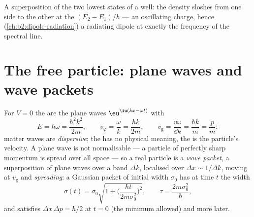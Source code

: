 \begin{omfigure}

{\small A superposition of the two lowest states of a well: the
density sloshes from one side to the other at the 
$(E_2 - E_1)/h$ --- an oscillating charge, hence (\cref{ch:b2:dipole-radiation})
a radiating dipole at exactly the frequency of the spectral line.}
\end{omfigure}

\section{The free particle: plane waves and wave packets}

\begin{proposition}\label{prop:b2:schrodinger-wave-functions:free}
For $V = 0$ the  are the plane waves $\eu^{\iu(kx -
\omega t)}$ with
\[
E = \hbar\omega = \frac{\hbar^2k^2}{2m}, \qquad
v_\varphi = \frac{\omega}{k} = \frac{\hbar k}{2m}, \qquad
v_{\text{g}} = \frac{\dd\omega}{\dd k} = \frac{\hbar k}{m} = \frac{p}{m} :
\]
matter waves are \emph{dispersive}; the  has no physical
meaning, the \emph{} is the particle's velocity. A plane
wave is not normalisable --- a particle of perfectly sharp momentum is
spread over all space --- so a real particle is a \emph{wave
packet}, a superposition of plane waves over a band
$\Delta k$, localised over $\Delta x \sim 1/\Delta k$, moving at $v_{\text{g}}$ and
\emph{spreading}: a Gaussian packet of initial width $\sigma_0$ has at
time $t$ the width
\[
\sigma(t) = \sigma_0\sqrt{1 + \Big(\frac{\hbar t}{2m\sigma_0^2}\Big)^2}, \qquad
\tau = \frac{2m\sigma_0^2}{\hbar} ,
\]
and satisfies $\Delta x\,\Delta p = \hbar/2$ at $t = 0$ (the minimum allowed)
and more later.
\end{proposition}

